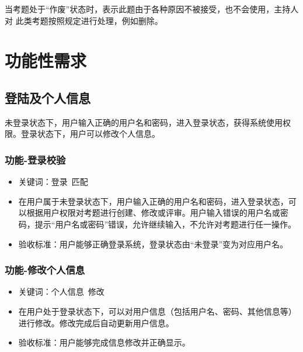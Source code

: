 \documentclass[hyperref, a4paper]{ctexart}
\providecommand{\tightlist}{%
  \setlength{\itemsep}{0pt}\setlength{\parskip}{0pt}}
\begin{document}
当考题处于``作废''状态时，表示此题由于各种原因不被接受，也不会使用，主持人对
此类考题按照规定进行处理，例如删除。

\hypertarget{ux529fux80fdux6027ux9700ux6c42}{%
\section{功能性需求}\label{ux529fux80fdux6027ux9700ux6c42}}

\hypertarget{ux767bux9646ux53caux4e2aux4ebaux4fe1ux606f}{%
\subsection{登陆及个人信息}\label{ux767bux9646ux53caux4e2aux4ebaux4fe1ux606f}}

未登录状态下，用户输入正确的用户名和密码，进入登录状态，获得系统使用权限。登录状态下，用户可以修改个人信息。

\hypertarget{ux529fux80fd-ux767bux5f55ux6821ux9a8c}{%
\subsubsection{功能-登录校验}\label{ux529fux80fd-ux767bux5f55ux6821ux9a8c}}

\begin{itemize}
\tightlist
\item
  关键词：登录~匹配
\item
  在用户属于未登录状态下，用户输入正确的用户名和密码，进入登录状态，可以根据用户权限对考题进行创建、修改或评审。用户输入错误的用户名或密码，提示``用户名或密码''错误，允许继续输入，不允许对考题进行任一操作。
\item
  验收标准：用户能够正确登录系统，登录状态由``未登录''变为对应用户名。
\end{itemize}

\hypertarget{ux529fux80fd-ux4feeux6539ux4e2aux4ebaux4fe1ux606f}{%
\subsubsection{功能-修改个人信息}\label{ux529fux80fd-ux4feeux6539ux4e2aux4ebaux4fe1ux606f}}

\begin{itemize}
\tightlist
\item
  关键词：个人信息~修改
\item
  在用户处于登录状态下，可以对用户信息（包括用户名、密码、其他信息等）进行修改。修改完成后自动更新用户信息。
\item
  验收标准：用户能够完成信息修改并正确显示。
\end{itemize}
\end{document}

